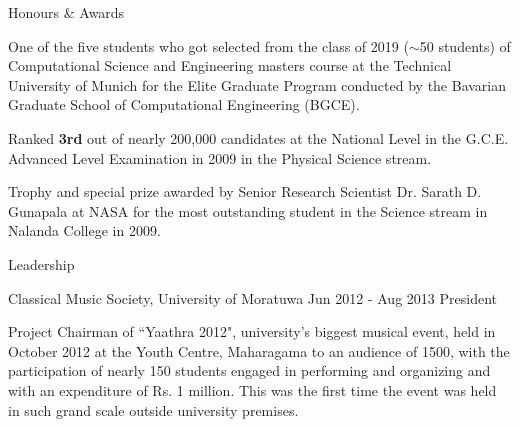 \documentclass[
	11pt, %
]{./../assets/resume} %
\begin{document}
\begin{rSection}{Honours \& Awards}
	\begin{rBulletedList}
        \item One of the five students who got selected from the class of 2019 ($\sim$50 students) of Computational Science and Engineering masters course at the Technical University of Munich for the Elite Graduate Program conducted by the Bavarian Graduate School of Computational Engineering (BGCE). 
        \item Ranked \textbf{3rd} out of nearly 200,000 candidates at the National Level in the G.C.E. Advanced Level Examination in 2009 in
        the Physical Science stream.
        \item Trophy and special prize awarded by Senior Research Scientist Dr. Sarath D. Gunapala at NASA for the most outstanding student in the Science stream in Nalanda College in 2009.
	\end{rBulletedList}
\end{rSection}


\begin{rSection}{Leadership}
	\begin{rShortProject}
    {Classical Music Society, University of Moratuwa} {Jun 2012 - Aug 2013}
    {President}
        \item Project Chairman of ``Yaathra 2012", university's biggest musical event, held in October 2012 at the Youth Centre, Maharagama to an audience of 1500, with the participation of nearly 150 students engaged in performing and organizing and with an expenditure of Rs. 1 million. This was the first time the event was held in such grand scale outside university premises.
    \end{rShortProject}
\end{rSection}



\end{document}
